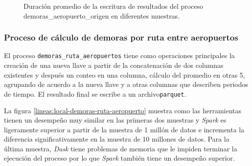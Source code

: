 \begin{figure}
\centering
{}
\caption{Duración promedio de la escritura de resultados del proceso demoras\_aeropuerto\_origen en diferentes muestras.}
\label{lineas:local-demoras-aeropuerto-origen-write}
\end{figure}

\subsubsection{Proceso de cálculo de demoras por ruta entre aeropuertos}

El proceso \texttt{demoras\_ruta\_aeropuertos} tiene como operaciones principales  la creación de una nueva llave a partir de la concatenación de dos columnas existentes y después un conteo en una columna, cálculo del promedio en otras 5, agrupando de acuerdo a la nueva llave y a otras columnas que describen periodos de tiempo. El resultado final se escribe a un archivo\texttt{parquet}.

La figura \ref{lineas:local-demoras-ruta-aeropuerto} muestra como las herramientas tienen un desempeño muy similar en las primeras dos muestras y \textit{Spark} es ligeramente superior a partir de la muestra de 1 millón de datos e incrementa la diferencia significativamente en la muestra de 10 millones de datos. Para la última muestra, \textit{Dask} tiene problemas de memoria que le impiden terminar la ejecución del proceso por lo que \textit{Spark} también tiene un desempeño superior. 

